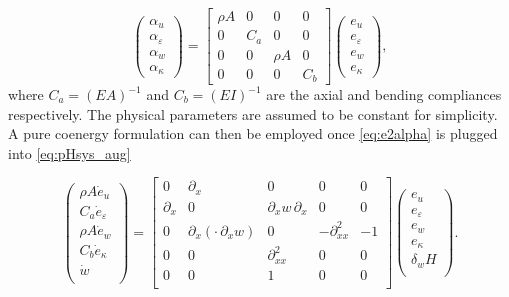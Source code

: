 \documentclass{ifacconf}
\begin{document}
\begin{equation}\label{eq:e2alpha}
	\begin{pmatrix}
		\alpha_u \\ \alpha_\varepsilon \\ \alpha_w \\ \alpha_\kappa
	\end{pmatrix} =
	\begin{bmatrix}
	\rho A & 0 & 0 & 0 \\
	0 & C_a & 0 & 0 \\
	0 & 0 & \rho A & 0 \\
	0 & 0 & 0 & C_b
	\end{bmatrix}
	\begin{pmatrix}
		e_u \\ e_\varepsilon \\ e_w \\ e_{\kappa}
	\end{pmatrix},
\end{equation}
where $C_a = (EA)^{-1}$ and $C_b = (EI)^{-1}$ are the axial and bending compliances respectively. The physical parameters are assumed to be constant for simplicity. A pure coenergy formulation can then be employed once \eqref{eq:e2alpha} is plugged into \eqref{eq:pHsys_aug}

\begin{equation}\label{eq:pHaug_e}
	\begin{pmatrix}
		\rho A \dot{e}_u \\
		C_a \dot{e}_\varepsilon \\
		\rho A \dot{e}_w \\
		C_b \dot{e}_\kappa \\
		\dot{w} \\
	\end{pmatrix} = 
	\begin{bmatrix}
		0 & \partial_x & 0 & 0 & 0\\
		\partial_x & 0 & \partial_x w \, \partial_x & 0 & 0 \\
		0 & \partial_x(\cdot \, \partial_x w) & 0 & -\partial_{xx}^2 & -1 \\
		0 & 0 & \partial_{xx}^2 & 0 & 0 \\ 
		0 & 0 & 1 & 0 & 0 \\
	\end{bmatrix}
	\begin{pmatrix}
		e_u \\
		e_\varepsilon \\
		e_w \\
		e_\kappa \\
		\delta_w H \\
	\end{pmatrix}.
\end{equation}
\end{document}
